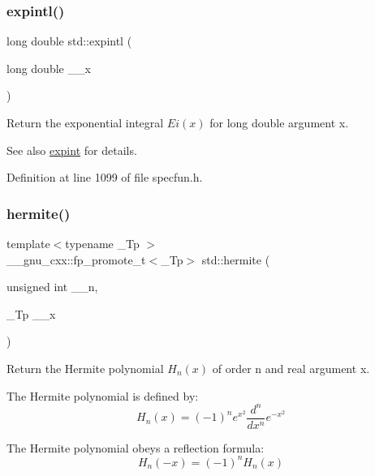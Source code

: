 \subsubsection{\texorpdfstring{expintl()}{expintl()}}
{\footnotesize\ttfamily long double std\+::expintl (\begin{DoxyParamCaption}\item[{long double}]{\+\_\+\+\_\+x }\end{DoxyParamCaption})\hspace{0.3cm}{\ttfamily [inline]}}

Return the exponential integral $ Ei(x) $ for {\ttfamily long double} argument {\ttfamily x}.

\begin{DoxySeeAlso}{See also}
\hyperlink{group__mathsf__std_ga0e9ac717a106ef54184b5f058c451782}{expint} for details. 
\end{DoxySeeAlso}


Definition at line 1099 of file specfun.\+h.

\mbox{\label{group__mathsf__std_ga8bd1626f1e3f7256c4fd13579f881183}} 
\subsubsection{\texorpdfstring{hermite()}{hermite()}}
{\footnotesize\ttfamily template$<$typename \+\_\+\+Tp $>$ \\
\+\_\+\+\_\+gnu\+\_\+cxx\+::fp\+\_\+promote\+\_\+t$<$\+\_\+\+Tp$>$ std\+::hermite (\begin{DoxyParamCaption}\item[{unsigned int}]{\+\_\+\+\_\+n,  }\item[{\+\_\+\+Tp}]{\+\_\+\+\_\+x }\end{DoxyParamCaption})\hspace{0.3cm}{\ttfamily [inline]}}

Return the Hermite polynomial $ H_n(x) $ of order n and {\ttfamily real} argument {\ttfamily x}.

The Hermite polynomial is defined by\+: \[ H_n(x) = (-1)^n e^{x^2} \frac{d^n}{dx^n} e^{-x^2} \]

The Hermite polynomial obeys a reflection formula\+: \[ H_n(-x) = (-1)^n H_n(x) \]


